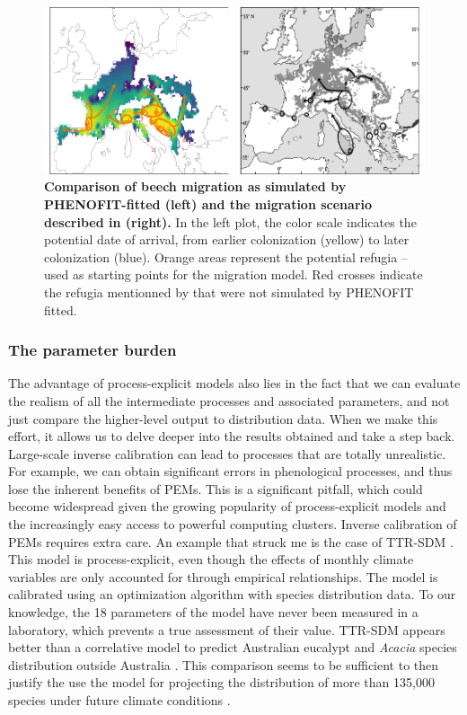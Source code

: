 \begin{figure}[h]
\centering
\includegraphics{discussion/figs/fagus_migration.pdf}
\caption{\textbf{Comparison of beech migration as simulated by PHENOFIT-fitted (left) and the migration scenario described in \citet{Magri2006} (right).} In the left plot, the color scale indicates the potential date of arrival, from earlier colonization (yellow) to later colonization (blue). Orange areas represent the potential refugia -- used as starting points for the migration model. Red crosses indicate the refugia mentionned by \citet{Magri2006} that were not simulated by PHENOFIT fitted.}
\label{fig:migration}
\end{figure}

\subsubsection{The parameter burden} 
\label{sec:parameter}

The advantage of process-explicit models also lies in the fact that we can evaluate the realism of all the intermediate processes and associated parameters, and not just compare the higher-level output to distribution data. When we make this effort, it allows us to delve deeper into the results obtained and take a step back. Large-scale inverse calibration can lead to processes that are totally unrealistic. For example, we can obtain significant errors in phenological processes, and thus lose the inherent benefits of PEMs.
This is a significant pitfall, which could become widespread given the growing popularity of process-explicit models and the increasingly easy access to powerful computing clusters.  Inverse calibration of PEMs requires extra care.
An example that struck me is the case of TTR-SDM \citep{Higgins2012}. This model is process-explicit, even though the effects of monthly climate variables are only accounted for through empirical relationships. The model is calibrated using an optimization algorithm with species distribution data. To our knowledge, the 18 parameters of the model have never been measured in a laboratory, which prevents a true assessment of their value. TTR-SDM appears better than a correlative model to predict Australian eucalypt and \textit{Acacia} species distribution outside Australia \citep{Higgins2020}. This comparison seems to be sufficient to then justify the use the model for projecting the distribution of more than 135,000 species under future climate conditions \citep{Conradi2024}. 

